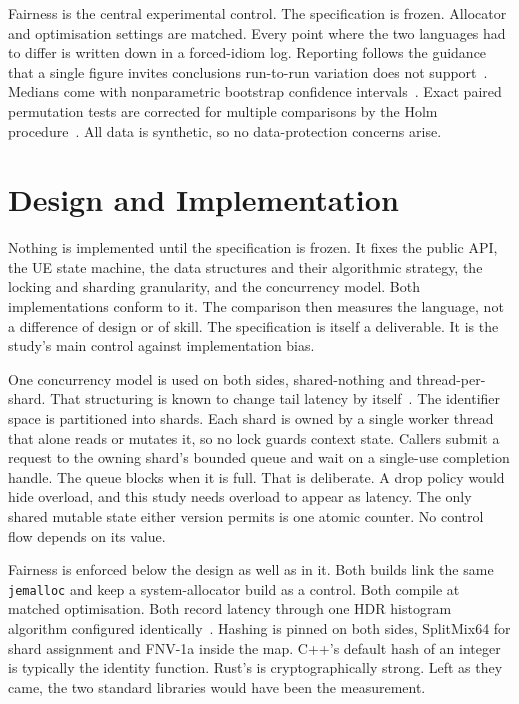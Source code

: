 \documentclass[english,twoside,openright,a4paper,censored,csm,software-track-2020]{HYthesisML}
\begin{document}
Fairness is the central experimental control. The specification is frozen. Allocator and
optimisation settings are matched. Every point where the two languages had to differ is
written down in a forced-idiom log. Reporting follows the guidance that a single figure
invites conclusions run-to-run variation does not
support~\cite{georges2007rigorous}. Medians come with nonparametric bootstrap confidence
intervals~\cite{efron1993bootstrap}. Exact paired permutation tests are corrected for
multiple comparisons by the Holm procedure~\cite{holm1979simple}. All data is synthetic,
so no data-protection concerns arise.

\chapter{Design and Implementation\label{chapter:design}}

Nothing is implemented until the specification is frozen. It fixes the public API, the
UE state machine, the data structures and their algorithmic strategy, the locking and
sharding granularity, and the concurrency model. Both implementations conform to it.
The comparison then measures the language, not a difference of design or of skill. The
specification is itself a deliverable. It is the study's main control against
implementation bias.

One concurrency model is used on both sides, shared-nothing and thread-per-shard.
That structuring is known to change tail latency by
itself~\cite{enberg2019threadpercore}. The identifier space is partitioned into shards.
Each shard is owned by a single worker thread that alone reads or mutates it, so no lock
guards context state. Callers submit a request to the owning shard's bounded queue and
wait on a single-use completion handle. The queue blocks when it is full. That is
deliberate. A drop policy would hide overload, and this study needs overload to appear as
latency. The only shared mutable state either version permits is one atomic counter. No
control flow depends on its value.

Fairness is enforced below the design as well as in it. Both builds link the same
\texttt{jemalloc} and keep a system-allocator build as a control. Both compile at
matched optimisation. Both record latency through one HDR histogram algorithm configured
identically~\cite{tene_hdrhistogram}. Hashing is pinned on both sides, SplitMix64 for
shard assignment and FNV-1a inside the map. C++'s default hash of an integer is typically
the identity function. Rust's is cryptographically strong. Left as they came, the two
standard libraries would have been the measurement.
\end{document}
